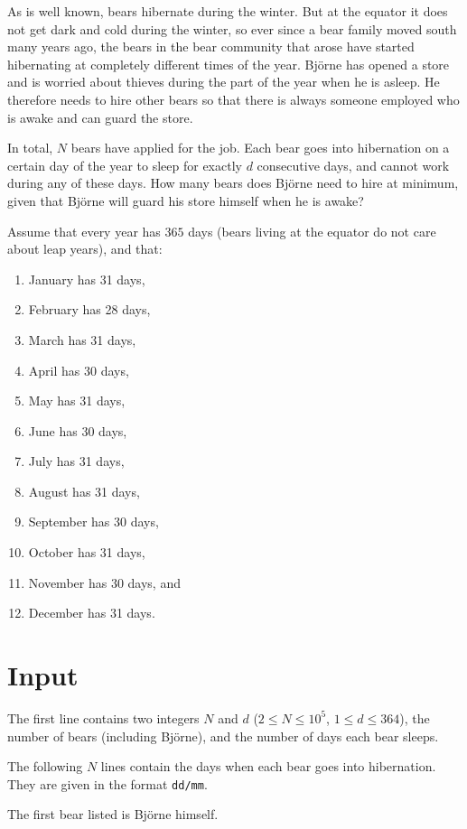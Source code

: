 As is well known, bears hibernate during the winter. But at the equator it does not get dark and cold during the winter,
so ever since a bear family moved south many years ago, the bears in the bear community that arose
have started hibernating at completely different times of the year.
Björne has opened a store and is worried about thieves during the part of the year when he is asleep.
He therefore needs to hire other bears so that there is always someone employed who is awake and can guard the store.

In total, $N$ bears have applied for the job.
Each bear goes into hibernation on a certain day of the year to sleep for exactly $d$ consecutive days, and cannot work during any of these days.
How many bears does Björne need to hire at minimum, given that Björne will guard his store himself when he is awake?

Assume that every year has $365$ days (bears living at the equator do not care about leap years), and that:
\begin{enumerate}
  \item January has 31 days,
  \item February has 28 days,
  \item March has 31 days,
  \item April has 30 days,
  \item May has 31 days,
  \item June has 30 days,
  \item July has 31 days,
  \item August has 31 days,
  \item September has 30 days,
  \item October has 31 days,
  \item November has 30 days, and
  \item December has 31 days.
\end{enumerate}

\section*{Input}
The first line contains two integers $N$ and $d$ ($2 \leq N \leq 10^5$, $1 \leq d \leq 364$), the number of bears (including Björne),
and the number of days each bear sleeps.

The following $N$ lines contain the days when each bear goes into hibernation. They are given in the format \texttt{dd/mm}.

The first bear listed is Björne himself.

